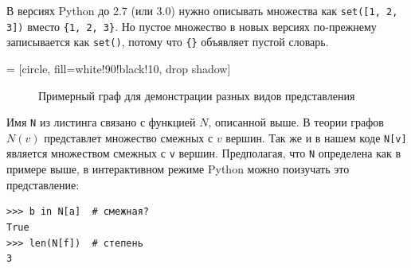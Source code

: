 \begin{note}
В версиях Python до 2.7 (или 3.0) нужно описывать множества как \texttt{set([1, 2, 3])} вместо \texttt{\{1, 2, 3\}}. Но пустое множество в новых версиях по-прежнему записывается как \texttt{set()}, потому что \texttt{\{\}} объявляет пустой словарь.
\end{note}


 = [circle,
						fill=white!90!black!10,
						drop shadow]

\begin{figure}[h]
\centering
{}

\caption{Примерный граф для демонстрации разных видов представления}
\label{fig:sample-graph}
\end{figure}

Имя \texttt{N} из листинга связано с функцией $N$, описанной выше. В теории графов $N(v)$ представлет множество смежных с $v$ вершин. Так же и в нашем коде \texttt{N[v]} является множеством смежных с \texttt{v} вершин. Предполагая, что \texttt{N} определена как в примере выше, в интерактивном режиме Python можно поизучать это представление:
\begin{lstlisting}
>>> b in N[a]  # смежная?
True
>>> len(N[f])  # степень
3
\end{lstlisting}


